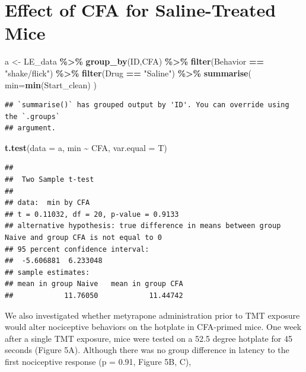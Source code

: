 \documentclass[
]{book}
\newenvironment{Shaded}{\begin{snugshade}}{\end{snugshade}}
\newcommand{\AttributeTok}[1]{\textcolor[rgb]{0.13,0.29,0.53}{#1}}
\newcommand{\FunctionTok}[1]{\textcolor[rgb]{0.13,0.29,0.53}{\textbf{#1}}}
\newcommand{\NormalTok}[1]{#1}
\newcommand{\OtherTok}[1]{\textcolor[rgb]{0.56,0.35,0.01}{#1}}
\newcommand{\SpecialCharTok}[1]{\textcolor[rgb]{0.81,0.36,0.00}{\textbf{#1}}}
\newcommand{\StringTok}[1]{\textcolor[rgb]{0.31,0.60,0.02}{#1}}
\begin{document}
\section*{Effect of CFA for Saline-Treated Mice}\label{effect-of-cfa-for-saline-treated-mice}

\begin{Shaded}
\begin{Highlighting}[]
\NormalTok{a }\OtherTok{\textless{}{-}}\NormalTok{ LE\_data }\SpecialCharTok{\%\textgreater{}\%}
  \FunctionTok{group\_by}\NormalTok{(ID,CFA) }\SpecialCharTok{\%\textgreater{}\%}
  \FunctionTok{filter}\NormalTok{(Behavior }\SpecialCharTok{==} \StringTok{"shake/flick"}\NormalTok{) }\SpecialCharTok{\%\textgreater{}\%}
  \FunctionTok{filter}\NormalTok{(Drug }\SpecialCharTok{==} \StringTok{"Saline"}\NormalTok{) }\SpecialCharTok{\%\textgreater{}\%}
  \FunctionTok{summarise}\NormalTok{(}
    \AttributeTok{min=}\FunctionTok{min}\NormalTok{(Start\_clean)}
\NormalTok{  )}
\end{Highlighting}
\end{Shaded}

\begin{verbatim}
## `summarise()` has grouped output by 'ID'. You can override using the `.groups`
## argument.
\end{verbatim}

\begin{Shaded}
\begin{Highlighting}[]
\FunctionTok{t.test}\NormalTok{(}\AttributeTok{data =}\NormalTok{ a, min }\SpecialCharTok{\textasciitilde{}}\NormalTok{ CFA, }\AttributeTok{var.equal =}\NormalTok{ T)}
\end{Highlighting}
\end{Shaded}

\begin{verbatim}
## 
##  Two Sample t-test
## 
## data:  min by CFA
## t = 0.11032, df = 20, p-value = 0.9133
## alternative hypothesis: true difference in means between group Naive and group CFA is not equal to 0
## 95 percent confidence interval:
##  -5.606881  6.233048
## sample estimates:
## mean in group Naive   mean in group CFA 
##            11.76050            11.44742
\end{verbatim}

We also investigated whether metyrapone administration prior to TMT exposure would alter nociceptive behaviors on the hotplate in CFA-primed mice. One week after a single TMT exposure, mice were tested on a 52.5 degree hotplate for 45 seconds (Figure 5A). Although there was no group difference in latency to the first nociceptive response (p = 0.91, Figure 5B, C),
\end{document}
